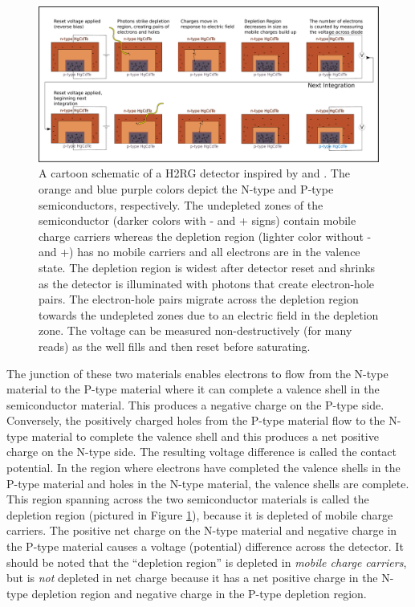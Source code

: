 \documentclass[]{aastex62}
\begin{document}
\begin{figure}[!hbtp]
\centering
\includegraphics[width=.99\columnwidth]{ideal_photodiode.pdf}
\caption{A cartoon schematic of a H2RG detector inspired by \citet{smith2008imgPersistence} and \citet{tulloch2018persistenceH2RG}.
The orange and blue purple colors depict the N-type and P-type semiconductors, respectively.
The undepleted zones of the semiconductor (darker colors with - and + signs) contain mobile charge carriers whereas the depletion region (lighter color without - and +) has no mobile carriers and all electrons are in the valence state.
The depletion region is widest after detector reset and shrinks as the detector is illuminated with photons that create electron-hole pairs.
The electron-hole pairs migrate across the depletion region towards the undepleted zones due to an electric field in the depletion zone.
The voltage can be measured non-destructively (for many reads) as the well fills and then reset before saturating.}\label{fig:npSchematic}
\end{figure}



The junction of these two materials enables electrons to flow from the N-type material to the P-type material where it can complete a valence shell in the semiconductor material.
This produces a negative charge on the P-type side.
Conversely, the positively charged holes from the P-type material flow to the N-type material to complete the valence shell and this produces a net positive charge on the N-type side.
The resulting voltage difference is called the contact potential.
In the region where electrons have completed the valence shells in the P-type material and holes in the N-type material, the valence shells are complete.
This region spanning across the two semiconductor materials is called the depletion region (pictured in Figure \ref{fig:npSchematic}), because it is depleted of mobile charge carriers.
The positive net charge on the N-type material and negative charge in the P-type material causes a voltage (potential) difference across the detector.
It should be noted that the ``depletion region'' is depleted in {\it mobile charge carriers}, but is {\it not} depleted in net charge because it has a net positive charge in the N-type depletion region and negative charge in the P-type depletion region.
\end{document}
